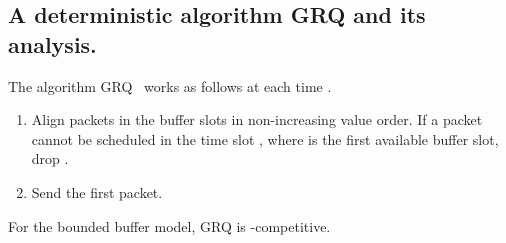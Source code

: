 \documentclass[final, 11pt]{article}
\begin{document}
\subsection{A deterministic algorithm GRQ and its analysis.}
\label{sec:me}

The algorithm GRQ~\cite{F09} works as follows at each time .

\begin{enumerate}
\item Align packets in the buffer slots in non-increasing value order. If a packet  cannot be scheduled in the time slot , where  is the first available buffer slot, drop .

\item Send the first packet.
\end{enumerate}

\begin{theorem}
For the bounded buffer model, GRQ is -competitive.
\label{theorem:sgd}
\end{theorem}
\end{document}
